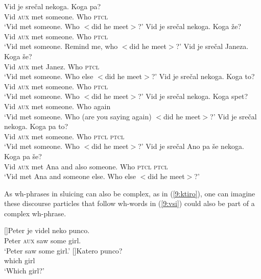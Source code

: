 \documentclass[output=paper,modfonts,newtxmath,hidelinks]{langscibook}
\begin{document}
\begin{exe}
\ex\label{9:vsi}
\begin{xlist}
 \ex 
 \gll Vid je srečal nekoga. Koga pa? \\
 Vid \textsc{aux} met someone. Who \textsc{ptcl} \\
 \trans `Vid met someone. Who $<$did he meet$>$?'
 \ex	
 \gll Vid je srečal nekoga. Koga že?\\
	 Vid \textsc{aux} met someone. Who \textsc{ptcl} \\
 \trans	`Vid met someone. Remind me, who $<$did he meet$>$?'
  \ex	
 \gll 	Vid je srečal Janeza. Koga še?\\
		Vid \textsc{aux} met Janez. Who \textsc{ptcl} \\
 \trans	`Vid met someone. Who else $<$did he meet$>$?'
 \ex	
 \gll 	Vid je srečal nekoga. Koga to?\\
		Vid \textsc{aux} met someone. Who \textsc{ptcl} \\
 \trans	`Vid met someone. Who $<$did he meet$>$?'
 \ex	
 \gll 	Vid je srečal nekoga. Koga spet?\\
		Vid \textsc{aux} met someone. Who again\\
 \trans	`Vid met someone. Who (are you saying again) $<$did he meet$>$?'
 \ex	
 \gll Vid je srečal nekoga. Koga pa to?\\
		Vid \textsc{aux} met someone. Who  \textsc{ptcl}  \textsc{ptcl}  \\
 \trans	`Vid met someone. Who $<$did he meet$>$?'
 \ex 
 \gll	Vid je srečal Ano pa še nekoga.  Koga pa še?\\
		Vid \textsc{aux} met Ana and also someone. Who \textsc{ptcl}  \textsc{ptcl} \\
 \trans	 `Vid met Ana and someone else. Who else $<$did he meet$>$?'
 \end{xlist}
\end{exe}

\noindent As wh-phrases in sluicing can also be complex, as in (\ref{9:ktiro}), one can imagine these discourse particles that follow wh-words in (\ref{9:vsi}) could also be part of a complex wh-phrase. 

\begin{exe}
 \ex\label{9:ktiro}
 \begin{xlist}
 []{\gll Peter je videl neko punco.\\
	Peter \textsc{aux} saw some girl.\\
    \trans `Peter saw some girl.'}
  []{\gll Katero punco?\\
  which girl\\
 \trans `Which girl?'}
 \end{xlist}
\end{exe}
\end{document}
